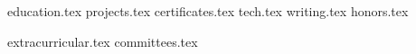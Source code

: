 \documentclass[11pt, a4paper]{awesome-cv}
\newcommand*{\sectiondir}{resume/}
\begin{document}
\makecvheader

{education.tex}
{projects.tex}
{certificates.tex}
{tech.tex}
{writing.tex}
{honors.tex}

{}
{}
{}
{}
{extracurricular.tex}
{committees.tex}
\end{document}
